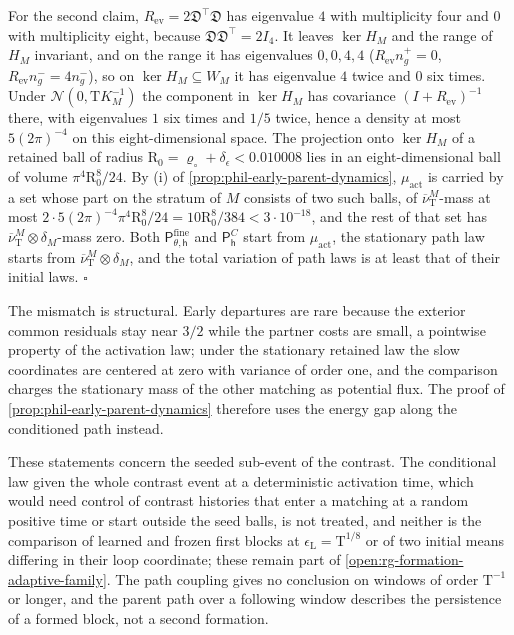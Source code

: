 For the second claim, \(R_{\mathrm{ev}}=2\mathfrak D^\top\mathfrak D\) has
eigenvalue \(4\) with multiplicity four and \(0\) with multiplicity eight,
because \(\mathfrak D\mathfrak D^\top=2I_4\). It leaves \(\ker H_M\) and the
range of \(H_M\) invariant, and on the range it has eigenvalues \(0,0,4,4\)
(\(R_{\mathrm{ev}}n^+_g=0\), \(R_{\mathrm{ev}}n^-_g=4n^-_g\)), so on
\(\ker H_M\subseteq W_M\) it has eigenvalue \(4\) twice and \(0\) six times.
Under \(\mathcal N(0,\mathrm TK_M^{-1})\) the component in \(\ker H_M\) has
covariance \((I+R_{\mathrm{ev}})^{-1}\) there, with eigenvalues \(1\) six times
and \(1/5\) twice, hence a density at most \(5(2\pi)^{-4}\) on this
eight-dimensional space. The projection onto \(\ker H_M\) of a retained ball of
radius \(\mathrm R_0=\varrho_\circ+\delta_\epsilon<0.010008\) lies in an
eight-dimensional ball of volume \(\pi^4\mathrm R_0^8/24\). By (i) of
\cref{prop:phil-early-parent-dynamics}, \(\mu_{\mathrm{act}}\) is carried by
a set whose part on the stratum of \(M\) consists of two such balls, of
\(\overline\nu^M_{\mathrm T}\)-mass at most
\(2\cdot5(2\pi)^{-4}\pi^4\mathrm R_0^8/24=10\mathrm R_0^8/384<3\cdot10^{-18}\),
and the rest of that set has \(\overline\nu^M_{\mathrm T}\otimes\delta_M\)-mass
zero. Both \(\mathsf P^{\mathrm{fine}}_{\theta,\mathsf h}\) and
\(\mathsf P^C_{\mathsf h}\) start from \(\mu_{\mathrm{act}}\), the stationary
path law starts from \(\overline\nu^M_{\mathrm T}\otimes\delta_M\), and the
total variation of path laws is at least that of their initial laws.
\(\square\)

The mismatch is structural. Early departures are rare because the exterior
common residuals stay near \(3/2\) while the partner costs are small, a
pointwise property of the activation law; under the stationary retained law the
slow coordinates are centered at zero with variance of order one, and the
comparison charges the stationary mass of the other matching as potential
flux. The proof of \cref{prop:phil-early-parent-dynamics} therefore uses the
energy gap along the conditioned path instead.

These statements concern the seeded sub-event of the contrast. The conditional
law given the whole contrast event at a deterministic activation time, which
would need control of contrast histories that enter a matching at a random
positive time or start outside the seed balls, is not treated, and neither is
the comparison of learned and frozen first blocks at
\(\epsilon_{\mathrm L}=\mathrm T^{1/8}\) or of two initial means differing in
their loop coordinate; these remain part of
\cref{open:rg-formation-adaptive-family}. The path coupling gives no
conclusion on windows of order \(\mathrm T^{-1}\) or longer, and the parent
path over a following window describes the persistence of a formed block, not a
second formation.
